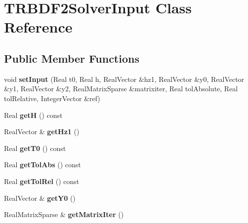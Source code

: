 \hypertarget{classTRBDF2SolverInput}{
\section{TRBDF2SolverInput Class Reference}
\label{classTRBDF2SolverInput}
}
\subsection*{Public Member Functions}
\begin{DoxyCompactItemize}
\item 
\hypertarget{classTRBDF2SolverInput_a9fd420dd043b684b0f011d9af2df03b5}{
void {\bfseries setInput} (Real t0, Real h, RealVector \&hz1, RealVector \&y0, RealVector \&y1, RealVector \&y2, RealMatrixSparse \&matrixiter, Real tolAbsolute, Real tolRelative, IntegerVector \&ref)}
\label{classTRBDF2SolverInput_a9fd420dd043b684b0f011d9af2df03b5}

\item 
\hypertarget{classTRBDF2SolverInput_ad17ef1264c9b34eb90c4e198cb732a66}{
Real {\bfseries getH} () const }
\label{classTRBDF2SolverInput_ad17ef1264c9b34eb90c4e198cb732a66}

\item 
\hypertarget{classTRBDF2SolverInput_a3c900fc6d938eb96f503f320cf653d04}{
RealVector \& {\bfseries getHz1} ()}
\label{classTRBDF2SolverInput_a3c900fc6d938eb96f503f320cf653d04}

\item 
\hypertarget{classTRBDF2SolverInput_aab9af0524f1c8c9ec1cfb9460f2eddb4}{
Real {\bfseries getT0} () const }
\label{classTRBDF2SolverInput_aab9af0524f1c8c9ec1cfb9460f2eddb4}

\item 
\hypertarget{classTRBDF2SolverInput_abd3aa47d16618f0aa93534ea135c2880}{
Real {\bfseries getTolAbs} () const }
\label{classTRBDF2SolverInput_abd3aa47d16618f0aa93534ea135c2880}

\item 
\hypertarget{classTRBDF2SolverInput_a214a679ef02dd617899af1268490def8}{
Real {\bfseries getTolRel} () const }
\label{classTRBDF2SolverInput_a214a679ef02dd617899af1268490def8}

\item 
\hypertarget{classTRBDF2SolverInput_a410a22478989c4810d8e584beff01dba}{
RealVector \& {\bfseries getY0} ()}
\label{classTRBDF2SolverInput_a410a22478989c4810d8e584beff01dba}

\item 
\hypertarget{classTRBDF2SolverInput_a55c49a8db7dd1ee1e44c62b04d856e83}{
RealMatrixSparse \& {\bfseries getMatrixIter} ()}
\label{classTRBDF2SolverInput_a55c49a8db7dd1ee1e44c62b04d856e83}


\end{DoxyCompactItemize}
